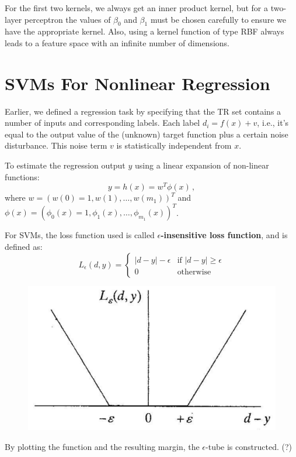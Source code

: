 For the first two kernels, we always get an inner product kernel, but for a two-layer perceptron the values of $\beta_0$ and $\beta_1$ must be chosen carefully to ensure we have the appropriate kernel. Also, using a kernel function of type RBF always leads to a feature space with an infinite number of dimensions.

\section{SVMs For Nonlinear Regression}

Earlier, we defined a regression task by specifying that the TR set contains a number of inputs and corresponding labels. Each label $d_i = f(x) + v$, i.e., it's equal to the output value of the (unknown) target function plus a certain noise disturbance. This noise term $v$ is statistically independent from $x$.

To estimate the regression output $y$ using a linear expansion of non-linear functions:
\begin{equation*}
    y = h(x) = w^T\phi(x) \,,
\end{equation*}
where $w = (w(0)=1, w(1), \dots , w(m_1))^T$ and $\phi(x) = (\phi_0(x)=1, \phi_1(x), \dots , \phi_{m_1}(x))^T$.

For SVMs, the loss function used is called \textbf{$\epsilon$-insensitive loss function}, and is defined as:
\begin{equation*}
    L_{\epsilon}(d,y) = \begin{cases}
                        |d-y| - \epsilon & \text{if } |d-y| \geq \epsilon \\
                        0 & \text{otherwise}
                        \end{cases}
\end{equation*}

\begin{figure}[h]
    \centering
    \includegraphics[width=0.5\linewidth]{img/epsiloninsensitive.png}
\end{figure}
By plotting the function and the resulting margin, the $\epsilon$-tube is constructed. (?)

